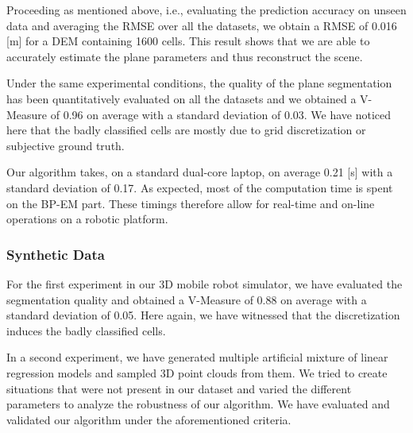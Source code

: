 Proceeding as mentioned above, i.e., evaluating the prediction accuracy on
unseen data and averaging the RMSE over all the datasets, we obtain a RMSE of
0.016 [m] for a DEM containing 1600 cells. This result shows that we are able
to accurately estimate the plane parameters and thus reconstruct the scene.

Under the same experimental conditions, the quality of the plane segmentation
has been quantitatively evaluated on all the datasets and we obtained a
V-Measure of 0.96 on average with a standard deviation of 0.03. We have noticed
here that the badly classified cells are mostly due to grid discretization
or subjective ground truth.

Our algorithm takes, on a standard dual-core laptop, on average 0.21 [s] with
a standard deviation of 0.17. As expected, most of the computation time is spent
on the BP-EM part. These timings therefore allow for real-time and on-line
operations on a robotic platform.

\subsubsection{Synthetic Data}

For the first experiment in our 3D mobile robot simulator, we have evaluated the
segmentation quality and obtained a V-Measure of 0.88 on average with a standard
deviation of 0.05. Here again, we have witnessed that the discretization induces
the badly classified cells.

In a second experiment, we have generated multiple artificial mixture of linear
regression models and sampled 3D point clouds from them. We tried to create
situations that were not present in our dataset and varied the different
parameters to analyze the robustness of our algorithm. We have evaluated and
validated our algorithm under the aforementioned criteria.
